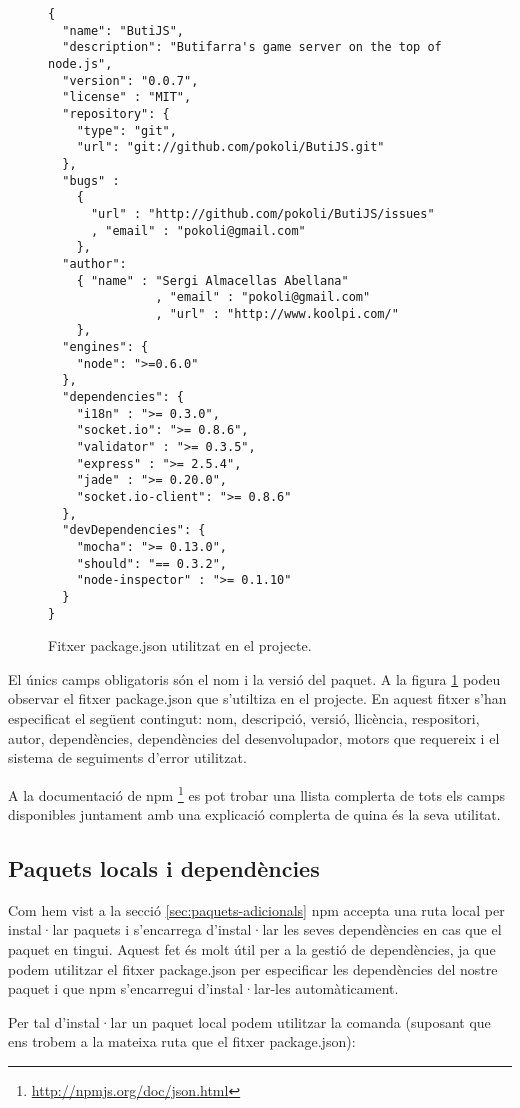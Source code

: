 \begin{figure}[htbp]
\begin{lstlisting}
{
  "name": "ButiJS",
  "description": "Butifarra's game server on the top of node.js",
  "version": "0.0.7",
  "license" : "MIT",
  "repository": {
    "type": "git",
    "url": "git://github.com/pokoli/ButiJS.git"
  },
  "bugs" :
    { 
      "url" : "http://github.com/pokoli/ButiJS/issues"
      , "email" : "pokoli@gmail.com"
    },
  "author":
    { "name" : "Sergi Almacellas Abellana"
               , "email" : "pokoli@gmail.com"
               , "url" : "http://www.koolpi.com/"
    },
  "engines": {
    "node": ">=0.6.0"
  },
  "dependencies": {
    "i18n" : ">= 0.3.0",
    "socket.io": ">= 0.8.6",
    "validator" : ">= 0.3.5",
    "express" : ">= 2.5.4",
    "jade" : ">= 0.20.0",
    "socket.io-client": ">= 0.8.6"
  },
  "devDependencies": {
    "mocha": ">= 0.13.0",
    "should": "== 0.3.2",
    "node-inspector" : ">= 0.1.10"
  }
}
\end{lstlisting}
\caption{Fitxer package.json utilitzat en el projecte.}
\label{fig:package.json}
\end{figure} 

El únics camps obligatoris són el nom i la versió del paquet. A la figura \ref{fig:package.json} podeu observar el fitxer package.json que s'utiltiza en el projecte. En aquest fitxer s'han especificat el següent contingut: nom, descripció, versió, llicència, respositori, autor, dependències, dependències del desenvolupador, motors que requereix i el sistema de seguiments d'error utilitzat. 

A la documentació de npm \footnote{\url{http://npmjs.org/doc/json.html}} es pot trobar una llista complerta de tots els camps disponibles juntament amb una explicació complerta de quina és la seva utilitat. 

\subsection{Paquets locals i dependències}

Com hem vist a la secció \ref{sec:paquets-adicionals} npm accepta una ruta local per instal·lar paquets i s'encarrega d'instal·lar les seves dependències en cas que el paquet en tingui. Aquest fet és molt útil per a la gestió de dependències, ja que podem utilitzar el fitxer package.json per especificar les dependències del nostre paquet i que npm s'encarregui d'instal·lar-les automàticament. 

Per tal d'instal·lar un paquet local podem utilitzar la comanda (suposant que ens trobem a la mateixa ruta que el fitxer package.json): 

